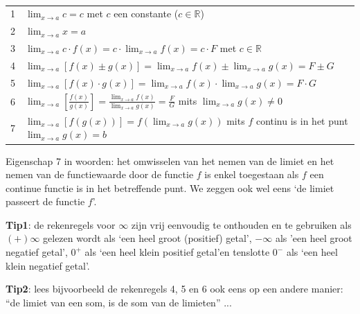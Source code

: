 \begin{ftrekenregel}
	\ 
	\begin{tabel*}{}
	\centering
	\begin{tabular}{ll}

		1 & $\lim_{x\to a}c=c$ met $c$ een constante ($c\in\mathbb{R}$)\\

		2 & $\lim_{x\to a}x=a$  \\

		3 & $\lim_{x\to a}c\cdot f(x)=c\cdot \lim_{x\to a}f(x)=c\cdot F$  met $c\in\mathbb{R}$\\

		4 & $\lim_{x\to a}\left[f(x)\pm g(x)\right]=\lim_{x\to a}f(x)\pm\lim_{x\to a}g(x)=F\pm G$  \\

		5 & $\lim_{x\to a}\left[f(x)\cdot g(x)\right]=\lim_{x\to a}f(x)\cdot \lim_{x\to a}g(x)=F\cdot G$  \\

		6 & $\lim_{x\to a}\left[\frac{f(x)}{g(x)}\right]=\frac{\lim_{x\to a}f(x)}{\lim_{x\to a}g(x)}=\frac{F}{G}$  mits $\lim_{x\to a}g(x)\neq0$\\

		7 & $\lim_{x\to a}\left[f\left(g(x)\right)\right]=f\left(\lim_{x\to a}g(x)\right)$  mits $f$ continu is in het punt $\lim_{x\to a}g(x)=b$ \\


	\end{tabular}
\end{tabel*}
\end{ftrekenregel}

Eigenschap 7 in woorden: het omwisselen van het nemen van
de limiet en het nemen van de functiewaarde door de functie $f$ is
enkel toegestaan als $f$ een continue functie is in het betreffende
punt. We zeggen ook wel eens \textquoteleft de limiet passeert de functie $f$\textquoteright.

\textbf{Tip1}: de rekenregels voor $\infty$ zijn vrij eenvoudig
te onthouden en te gebruiken als $(+)\infty$ gelezen wordt als \textquoteleft een
heel groot (positief) getal\textquoteright, $-\infty$ als 'een heel groot negatief
getal', $0^{+}$ als \textquoteleft een heel klein positief getal\textquoteright en tenslotte $0^{-}$
als \textquoteleft een heel klein negatief getal\textquoteright.

\textbf{Tip2}: lees bijvoorbeeld de rekenregels 4, 5 en 6 ook eens
op een andere manier: ``de limiet van een som, is de som van de limieten''
...

